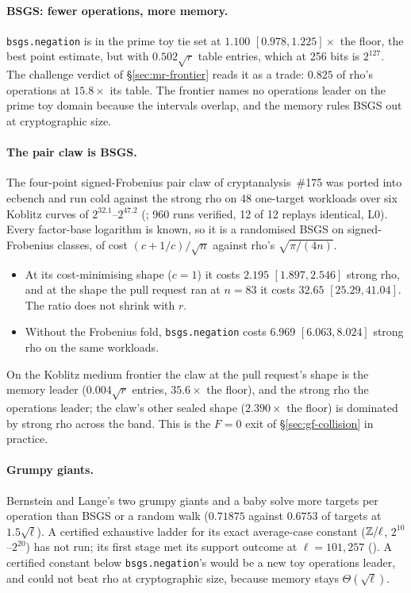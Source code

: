 \paragraph{BSGS: fewer operations, more memory.} \texttt{bsgs.negation} is in
the prime toy tie set at $1.100$ $[0.978,1.225]\times$ the floor, the best
point estimate, but with $0.502\sqrt r$ table entries, which at 256 bits
is $2^{127}$. The challenge verdict of \S\ref{sec:mr-frontier} reads it as a
trade: $0.825$ of rho's operations at $15.8\times$ its table. The frontier names no
operations leader on the prime toy domain because the intervals overlap,
and the memory rules BSGS out at cryptographic size.

\paragraph{The pair claw is BSGS.} The four-point signed-Frobenius pair claw
of cryptanalysis~\#175 was ported into ecbench and run cold against the
strong rho on 48 one-target workloads over six Koblitz curves of
$2^{32.1}$--$2^{47.2}$ (; 960 runs
verified, 12 of 12 replays identical, L0). Every factor-base logarithm is
known, so it is a randomised BSGS on signed-Frobenius classes, of cost
$(c+1/c)/\sqrt n$ against rho's $\sqrt{\pi/(4n)}$.
\begin{itemize}
\item At its cost-minimising shape ($c=1$) it costs $2.195$ $[1.897,2.546]$
  strong rho, and at the shape the pull request ran at $n=83$ it costs
  $32.65$ $[25.29,41.04]$. The ratio does not shrink with $r$.
\item Without the Frobenius fold, \texttt{bsgs.negation} costs $6.969$
  $[6.063,8.024]$ strong rho on the same workloads.
\end{itemize}
On the Koblitz medium frontier the claw at the pull request's shape is the
memory leader ($0.004\sqrt r$ entries, $35.6\times$ the floor), and the strong
rho the operations leader; the claw's other sealed shape ($2.390\times$ the
floor) is dominated by strong rho across the band. This is the $F=0$ exit of \S\ref{sec:gf-collision} in
practice.

\paragraph{Grumpy giants.} Bernstein and Lange's two grumpy giants and a baby
solve more targets per operation than BSGS or a random walk ($0.71875$
against $0.6753$ of targets at $1.5\sqrt\ell$). A certified exhaustive
ladder for its exact average-case constant ($\mathbb{Z}/\ell$, $2^{10}$--$2^{20}$)
has not run; its first stage met its support outcome at $\ell=101,257$
().
A certified constant below \texttt{bsgs.negation}'s would be a new toy
operations leader, and could not beat rho at cryptographic size, because
memory stays $\Theta(\sqrt\ell)$.

